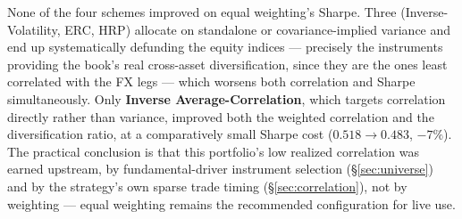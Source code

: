 \documentclass[11pt]{article}
\begin{document}
None of the four schemes improved on equal weighting's Sharpe. Three (Inverse-Volatility, ERC, HRP)
allocate on standalone or covariance-implied variance and end up systematically defunding the equity
indices --- precisely the instruments providing the book's real cross-asset diversification, since
they are the ones least correlated with the FX legs --- which worsens both correlation and Sharpe
simultaneously. Only \textbf{Inverse Average-Correlation}, which targets correlation directly rather
than variance, improved both the weighted correlation and the diversification ratio, at a comparatively
small Sharpe cost ($0.518\to0.483$, $-7\%$). The practical conclusion is that this portfolio's low
realized correlation was earned upstream, by fundamental-driver instrument selection
(\S\ref{sec:universe}) and by the strategy's own sparse trade timing (\S\ref{sec:correlation}), not by
weighting --- equal weighting remains the recommended configuration for live use.
\end{document}
